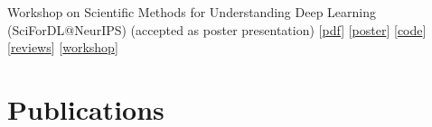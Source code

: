 \documentclass{scrartcl}
\begin{document}
\begin{enumerate}
Workshop on Scientific Methods for Understanding Deep Learning (SciForDL@NeurIPS)\newline
(accepted as poster presentation)\newline
{\footnotesize
[\href{https://pwelke.github.io/publications/jogl2024expressivitynotessential.pdf}{pdf}]
[\href{https://pwelke.github.io/publications/jogl2024expressivitynotessentialposter.pdf}{poster}]
[\href{https://github.com/ocatias/KnowledgeDistillationGNNs_SciForDL}{code}]
[\href{https://openreview.net/forum?id=5v7hpSy3Ir}{reviews}]
[\href{https://scienceofdlworkshop.github.io}{workshop}]
}
\seti
\end{enumerate}

\section{Publications}
\end{document}
